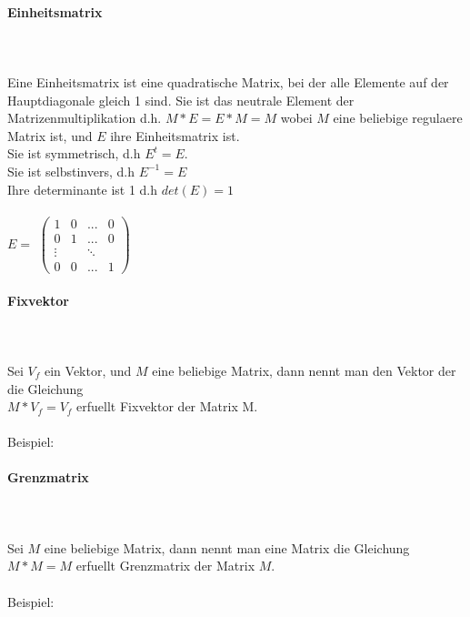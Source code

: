 \documentclass[a4paper]{article} %
\begin{document}
	\paragraph{Einheitsmatrix}
	 \hspace{0 cm} \\ \noindent \\ Eine Einheitsmatrix ist eine quadratische Matrix, bei der alle Elemente auf der Hauptdiagonale gleich 1 sind.
	Sie ist das neutrale Element der Matrizenmultiplikation d.h. $M*E = E*M = M$ wobei $M$ eine beliebige regulaere Matrix ist, und $E$ ihre Einheitsmatrix ist.\\
	Sie ist symmetrisch, d.h $E^{t}=E$.\\
	Sie ist selbstinvers, d.h $E^{-1}=E$\\
	Ihre determinante ist 1 d.h $det(E)=1$\\\\
	$E =$
		$
		\begin{pmatrix}
		1 & 0 	& ... 	& 0\\
		0 & 1 	& ...	& 0\\
		\vdots  &     	& \ddots  \\
		0 & 0	& ...	& 1
		\end{pmatrix}
		$\\

	\newpage
	\paragraph{Fixvektor}
		\hspace{0 cm} \\ \noindent \\
	Sei  $V_f$ ein Vektor, und $M$ eine beliebige Matrix, dann nennt man den Vektor der die Gleichung \\	$M * V_f = V_f$ erfuellt Fixvektor der Matrix M.\\\\
	Beispiel:

	\paragraph{Grenzmatrix}
	 \hspace{0 cm} \\ \noindent \\
	Sei $M$ eine beliebige Matrix, dann nennt man eine Matrix die Gleichung $M * M = M$ erfuellt Grenzmatrix der Matrix $M$.
	\\\\
	Beispiel:
\end{document}
